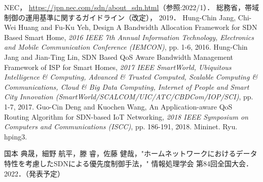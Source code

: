 \documentclass[a4paper,11pt,uplatex]{ujreport}
\begin{document}
\begin{thebibliography}{99}
   NEC， \url{https://jpn.nec.com/sdn/about_sdn.html}（参照:2022/1）．
   総務省，帯域制御の運用基準に関するガイドライン（改定）， 2019．
   Hung-Chin Jang, Chi-Wei Huang and Fu-Ku Yeh, Design
  A Bandwidth Allocation Framework for SDN Based Smart
  Home, \textit{2016 IEEE 7th Annual Information Technology, 
  Electronics and Mobile Communication Conference (IEMCON)}, 
  pp. 1-6, 2016.
   Hung-Chin Jang and Jian-Ting Lin, SDN Based QoS Aware Bandwidth Management Framework of ISP for Smart Homes, \textit{2017 IEEE SmartWorld, Ubiquitous Intelligence \& Computing, Advanced \& Trusted Computed, Scalable Computing \& Communications, Cloud \& Big Data Computing, Internet of People and Smart City Innovation (SmartWorld/SCALCOM/UIC/ATC/CBDCom/IOP/SCI)}, pp. 1-7, 2017.
   Guo-Cin Deng and Kuochen Wang, An Application-aware QoS Routing Algorithm for SDN-based IoT Networking, \textit{2018 IEEE Symposium on Computers and Communications (ISCC)}, pp. 186-191, 2018.
   Mininet.
   Ryu.
   hping3.
\end{thebibliography}

% 
% 

\label{chap:Bibiliography}

\renewcommand{\bibname}{研究業績}

\begin{thebibliography}{99}
  \bibitem{} 国本 典晟，細野 航平，滕 睿，佐藤 健哉，"ホームネットワークにおけるデータ特性を考慮したSDNによる優先度制御手法，" 情報処理学会 第84回全国大会．2022．（発表予定）
\end{thebibliography}

\label{chap:Publications}

\end{document}
